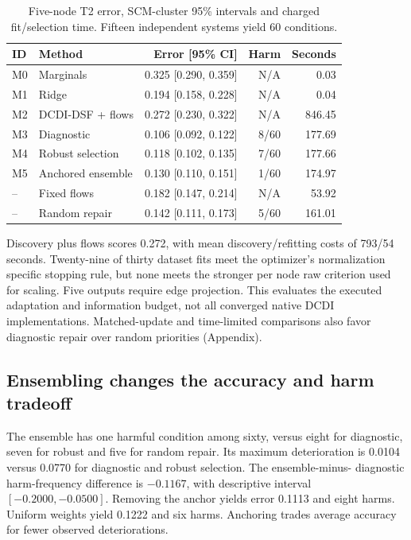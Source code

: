 \documentclass{svproc}
\begin{document}
\begin{table}[!htb]
\setlength{\tabcolsep}{4pt}
\caption{Five-node T2 error, SCM-cluster 95\% intervals and charged fit/selection time. Fifteen independent systems yield 60 conditions.}
\label{tab:controlled}
\centering
\begin{tabular}{@{}llrrr@{}}
\toprule
ID & Method & Error [95\% CI] & Harm & Seconds\\
\midrule
M0 & Marginals & 0.325 [0.290, 0.359] & N/A & 0.03 \\
M1 & Ridge & 0.194 [0.158, 0.228] & N/A & 0.04 \\
M2 & DCDI-DSF + flows & 0.272 [0.230, 0.322] & N/A & 846.45 \\
M3 & Diagnostic & 0.106 [0.092, 0.122] & 8/60 & 177.69 \\
M4 & Robust selection & 0.118 [0.102, 0.135] & 7/60 & 177.66 \\
M5 & Anchored ensemble & 0.130 [0.110, 0.151] & 1/60 & 174.97 \\
-- & Fixed flows & 0.182 [0.147, 0.214] & N/A & 53.92 \\
-- & Random repair & 0.142 [0.111, 0.173] & 5/60 & 161.01 \\
\bottomrule
\end{tabular}
\end{table}

Discovery plus flows scores 0.272, with mean discovery/refitting costs of
793/54 seconds. Twenty-nine of thirty dataset fits meet the optimizer's
normalization specific stopping rule, but none meets the stronger per node raw
criterion used for scaling. Five outputs require edge projection. This evaluates
the executed adaptation and information budget, not all converged native DCDI
implementations.
Matched-update and time-limited comparisons also favor diagnostic repair over
random priorities (Appendix).

\subsection{Ensembling changes the accuracy and harm tradeoff}
The ensemble has one harmful condition among sixty, versus eight for diagnostic,
seven for robust and five for random repair. Its maximum deterioration is 0.0104 versus 0.0770 for diagnostic and robust selection. The ensemble-minus-
diagnostic harm-frequency difference is $-0.1167$, with descriptive interval
$[-0.2000,-0.0500]$. Removing the anchor yields error 0.1113 and eight harms.
Uniform weights yield 0.1222 and six harms. Anchoring trades average accuracy
for fewer observed deteriorations. 
\end{document}
